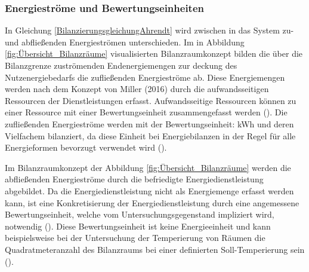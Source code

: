 
\subsubsection{Energieströme und Bewertungseinheiten}

In Gleichung \eqref{BilanzierungsgleichungAhrendt} wird zwischen in das System zu- und abfließenden Energieströmen unterschieden.
Im in Abbildung \eqref{fig:Übersicht_Bilanzräume} visualisierten Bilanzraumkonzept bilden die über die Bilanzgrenze zuströmenden Endenergiemengen 
zur deckung des Nutzenergiebedarfs die zufließenden Energieströme ab. 
Diese Energiemengen werden nach dem Konzept von Miller (2016) durch die aufwandsseitigen Ressourcen der Dienstleistungen erfasst.
Aufwandsseitige Ressourcen können zu einer Ressource mit einer Bewertungseinheit zusammengefasst werden (\cite[S. 112]{Miller.2016}).  
Die zufließenden Energieströme werden mit der Bewertungseinheit: kWh und deren Vielfachem bilanziert, da diese Einheit bei Energiebilanzen in der Regel 
für alle Energieformen bevorzugt verwendet wird (\cite[S. 65]{Konstantin.2023}).

Im Bilanzraumkonzept der Abbildung \eqref{fig:Übersicht_Bilanzräume} werden die abfließenden Energieströme durch die befriedigte Energiedienstleistung abgebildet.
Da die Energiedienstleistung nicht als Energiemenge erfasst werden kann, ist eine Konkretisierung der Energiedienstleistung durch eine angemessene Bewertungseinheit, 
welche vom Untersuchungsgegenstand impliziert wird, notwendig (\cite{Miller.2016}). 
Diese Bewertungseinheit ist keine Energieeinheit und kann beispielsweise bei der Untersuchung der Temperierung 
von Räumen die Quadratmeteranzahl des Bilanzraums bei einer definierten Soll-Temperierung sein (\cite{Miller.2016}). 


